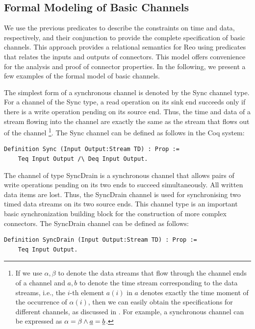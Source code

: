 \documentclass[preprint,3p]{elsarticle}
\newcommand{\xy}[1]{{#1}}
\begin{document}
\subsection{Formal Modeling of Basic Channels}

\xy{We use the previous predicates} to describe the constraints on time and data, respectively, \xy{and their conjunction} to provide the complete specification of basic channels. \xy{This approach provides a relational semantics for Reo using predicates that relates the inputs and outputs of connectors.} This model offers convenience for the analysis and proof of connector properties. In the following, we present a few examples of the formal model of basic channels.

The simplest form of a synchronous channel is denoted by the Sync channel type. For a channel of the Sync type, a read operation on
its sink end succeeds only if there is a write operation pending on its source end. Thus, the time and data of a stream flowing
into the channel are exactly the same as the stream that flows out of the channel
\footnote{If we use $\alpha,\beta$ to denote the data streams that flow through the channel ends of a channel and $a,b$ to denote the time stream corresponding to the data streams, i.e., the $i$-th element $a(i)$ in $a$ denotes exactly the time moment of the occurrence of $\alpha(i)$, then we can easily obtain the specifications for different channels, as discussed in \cite{Sun12,SAA+12}. For example, a synchronous channel can be expressed as $\alpha=\beta \wedge \emph{a}=\emph{b}$.}.
The Sync channel can be defined as follows in the Coq system:
\begin{lstlisting}[language=coq]
Definition Sync (Input Output:Stream TD) : Prop :=
    Teq Input Output /\ Deq Input Output.
\end{lstlisting}


The channel of type SyncDrain is a synchronous channel that allows pairs of write operations pending on its two ends to succeed simultaneously. All written data items are lost. Thus, the SyncDrain channel is used for synchronising two timed data streams on its two source ends. This channel type is an important basic synchronization building block for the construction of more complex connectors. The SyncDrain channel can be defined as follows:
\begin{lstlisting}[language=coq]
Definition SyncDrain (Input Output:Stream TD) : Prop :=
    Teq Input Output.
\end{lstlisting}
\end{document}
